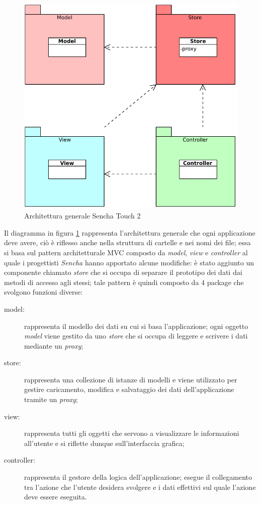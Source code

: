 \begin{figure}[htb]
\centering
\includegraphics[scale=0.6]{gfx/class/Sencha_Touch_2.pdf}
\caption{Architettura generale Sencha Touch 2}
\label{fig:architettura Sencha}
\end{figure}
Il diagramma in figura \ref{fig:architettura Sencha} rappresenta l'architettura generale che ogni applicazione deve avere, ciò è riflesso anche nella struttura di cartelle e nei nomi dei file; essa si basa sul pattern architetturale \ac{MVC} composto da \emph{model}, \emph{view} e \emph{controller} al quale i progettisti \emph{Sencha} hanno apportato alcune modifiche: è stato aggiunto un componente chiamato \emph{store} che si occupa di separare il prototipo dei dati dai metodi di accesso agli stessi; tale pattern è quindi composto da 4 package che svolgono funzioni diverse:
\begin{description}
\item[model:] rappresenta il modello dei dati su cui si basa l'applicazione; ogni oggetto \emph{model} viene gestito da uno \emph{store} che si occupa di leggere e scrivere i dati mediante un \emph{proxy};
\item[store:] rappresenta una collezione di istanze di modelli e viene utilizzato per gestire caricamento, modifica e salvataggio dei dati dell'applicazione tramite un \emph{proxy};
\item[view:] rappresenta tutti gli oggetti che servono a visualizzare le informazioni all'utente e si riflette dunque sull'interfaccia grafica;
\item[controller:] rappresenta il gestore della logica dell'applicazione; esegue il collegamento tra l'azione che l'utente desidera svolgere e i dati effettivi sul quale l'azione deve essere eseguita.
\end{description}

